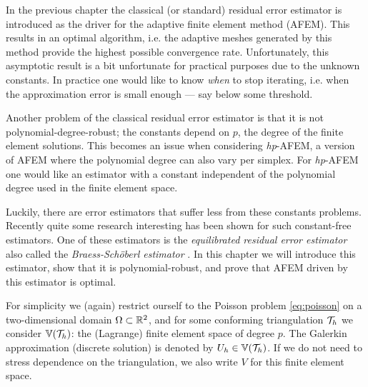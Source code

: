 \documentclass[thesis.tex]{subfiles}
\begin{document}
In the previous chapter the classical (or standard) residual error estimator is introduced as the driver for the
adaptive finite element method (AFEM). This results in an optimal algorithm, i.e. the adaptive meshes
generated by this method provide the highest possible convergence rate. Unfortunately, this asymptotic result
is a bit unfortunate for practical purposes due to the unknown constants. In practice
one would like to know \emph{when} to stop iterating, i.e. when the approximation error is small enough --- say
below some threshold. 

Another problem of the classical residual error estimator is that it is not polynomial-degree-robust; 
the constants depend on $p$, the degree of the finite element solutions. This becomes an issue
when considering \emph{hp}-AFEM, a version of AFEM where the polynomial degree can also vary
per simplex. For \emph{hp}-AFEM one would like an estimator with a constant independent of the polynomial degree
used in the finite element space.

Luckily, there are error estimators that suffer less from these constants problems. Recently quite
some research interesting has been shown for such constant-free estimators. One of these estimators is the
\emph{equilibrated residual error estimator} also called the \emph{Braess-Sch\"oberl estimator} \cite{braessequil, braessequilrobust,ernequil}.
In this chapter we will introduce this estimator, show that it is polynomial-robust, and prove that AFEM driven 
by this estimator is optimal.

For simplicity we (again) restrict ourself to the Poisson problem \eqref{eq:poisson} on a two-dimensional domain $\Omega \subset \mathbb{R}^2$,
and for some conforming triangulation $\mathcal{T}_h$ we consider $\mathbb{V}(\mathcal{T}_h)$: the (Lagrange) finite element space of degree $p$. 
The Galerkin approximation (discrete solution) is denoted by $U_h \in \mathbb{V}(\mathcal{T}_h)$. If we do not need to stress dependence on the triangulation, we 
also write $V$ for this finite element space.
\end{document}

